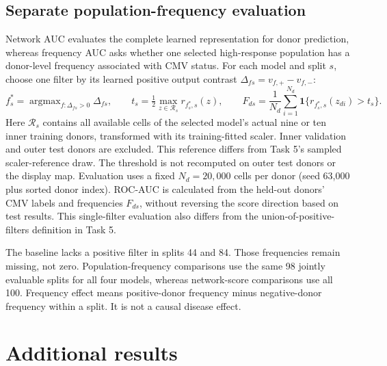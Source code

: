 \documentclass[11pt,a4paper]{article}
\begin{document}
\subsection{Separate population-frequency evaluation}
Network AUC evaluates the complete learned representation for donor prediction, whereas frequency AUC asks whether one selected high-response population has a donor-level frequency associated with CMV status. For each model and split $s$, choose one filter by its learned positive output contrast $\Delta_{fs}=v_{f,+}-v_{f,-}$:
\[
f_s^*=\mathop{\arg\max}_{f:\Delta_{fs}>0}\Delta_{fs},\qquad
t_s=\tfrac12\max_{z\in\mathcal R_s}r_{f_s^*,s}(z),\qquad
F_{ds}=\frac1{N_d}\sum_{i=1}^{N_d}\mathbf1\{r_{f_s^*,s}(z_{di})>t_s\}.
\]
Here $\mathcal R_s$ contains all available cells of the selected model's actual nine or ten inner training donors, transformed with its training-fitted scaler. Inner validation and outer test donors are excluded. This reference differs from Task 5's sampled scaler-reference draw. The threshold is not recomputed on outer test donors or the display map. Evaluation uses a fixed $N_d=20{,}000$ cells per donor (seed 63,000 plus sorted donor index). ROC-AUC is calculated from the held-out donors' CMV labels and frequencies $F_{ds}$, without reversing the score direction based on test results. This single-filter evaluation also differs from the union-of-positive-filters definition in Task 5.

The baseline lacks a positive filter in splits 44 and 84. Those frequencies remain missing, not zero. Population-frequency comparisons use the same 98 jointly evaluable splits for all four models, whereas network-score comparisons use all 100. Frequency effect means positive-donor frequency minus negative-donor frequency within a split. It is not a causal disease effect.

\section{Additional results}
\end{document}
